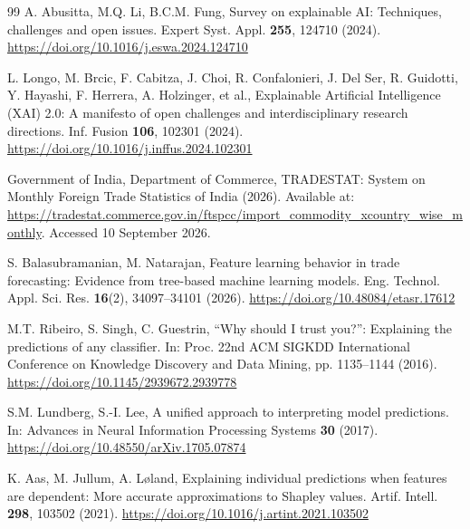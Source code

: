 \documentclass[pdftex,sn-mathphys-num]{sn-jnl}
\begin{document}
\begin{thebibliography}{99}
 A. Abusitta, M.Q. Li, B.C.M. Fung, Survey on explainable AI: Techniques, challenges and open issues. Expert Syst. Appl. \textbf{255}, 124710 (2024). \url{https://doi.org/10.1016/j.eswa.2024.124710}

 L. Longo, M. Brcic, F. Cabitza, J. Choi, R. Confalonieri, J. Del Ser, R. Guidotti, Y. Hayashi, F. Herrera, A. Holzinger, et al., Explainable Artificial Intelligence (XAI) 2.0: A manifesto of open challenges and interdisciplinary research directions. Inf. Fusion \textbf{106}, 102301 (2024). \url{https://doi.org/10.1016/j.inffus.2024.102301}

 Government of India, Department of Commerce, TRADESTAT: System on Monthly Foreign Trade Statistics of India (2026). Available at: \url{https://tradestat.commerce.gov.in/ftspcc/import_commodity_xcountry_wise_monthly}. Accessed 10 September 2026.

 S. Balasubramanian, M. Natarajan, Feature learning behavior in trade forecasting: Evidence from tree-based machine learning models. Eng. Technol. Appl. Sci. Res. \textbf{16}(2), 34097--34101 (2026). \url{https://doi.org/10.48084/etasr.17612}

 M.T. Ribeiro, S. Singh, C. Guestrin, ``Why should I trust you?'': Explaining the predictions of any classifier. In: Proc. 22nd ACM SIGKDD International Conference on Knowledge Discovery and Data Mining, pp. 1135--1144 (2016). \url{https://doi.org/10.1145/2939672.2939778}

 S.M. Lundberg, S.-I. Lee, A unified approach to interpreting model predictions. In: Advances in Neural Information Processing Systems \textbf{30} (2017). \url{https://doi.org/10.48550/arXiv.1705.07874}

 K. Aas, M. Jullum, A. L{\o}land, Explaining individual predictions when features are dependent: More accurate approximations to Shapley values. Artif. Intell. \textbf{298}, 103502 (2021). \url{https://doi.org/10.1016/j.artint.2021.103502}


\end{thebibliography}
\end{document}
